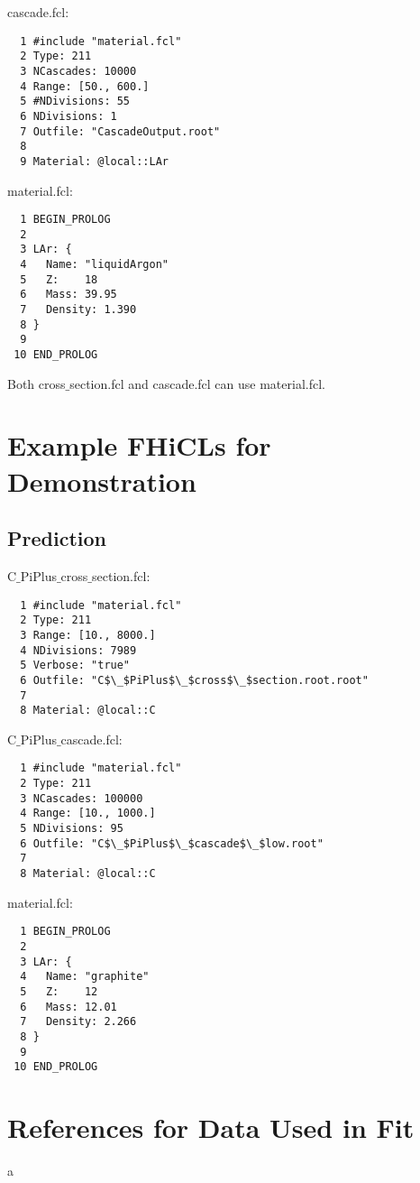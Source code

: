 \documentclass[12pt]{article}
\begin{document}
cascade.fcl:
\begin{lstlisting}
  1 #include "material.fcl"
  2 Type: 211
  3 NCascades: 10000
  4 Range: [50., 600.]
  5 #NDivisions: 55
  6 NDivisions: 1
  7 Outfile: "CascadeOutput.root"
  8 
  9 Material: @local::LAr
\end{lstlisting}

material.fcl:
\begin{lstlisting}
  1 BEGIN_PROLOG
  2 
  3 LAr: {
  4   Name: "liquidArgon"
  5   Z:    18
  6   Mass: 39.95
  7   Density: 1.390
  8 }
  9 
 10 END_PROLOG
\end{lstlisting}

Both cross$\_$section.fcl and cascade.fcl can use material.fcl.

\newpage

\section{Example FHiCLs for Demonstration}\label{app:Demonstration_FHICL}

\subsection{Prediction}

C$\_$PiPlus$\_$cross$\_$section.fcl:
\begin{lstlisting}
  1 #include "material.fcl"
  2 Type: 211
  3 Range: [10., 8000.]
  4 NDivisions: 7989
  5 Verbose: "true"
  6 Outfile: "C$\_$PiPlus$\_$cross$\_$section.root.root"
  7 
  8 Material: @local::C
\end{lstlisting}

C$\_$PiPlus$\_$cascade.fcl:
\begin{lstlisting}
  1 #include "material.fcl"
  2 Type: 211
  3 NCascades: 100000
  4 Range: [10., 1000.]
  5 NDivisions: 95
  6 Outfile: "C$\_$PiPlus$\_$cascade$\_$low.root"
  7 
  8 Material: @local::C
\end{lstlisting}

material.fcl:
\begin{lstlisting}
  1 BEGIN_PROLOG
  2 
  3 LAr: {
  4   Name: "graphite"
  5   Z:    12
  6   Mass: 12.01
  7   Density: 2.266
  8 }
  9 
 10 END_PROLOG
\end{lstlisting}

\section{References for Data Used in Fit}\label{app:Data_refs}
a
\end{document}
